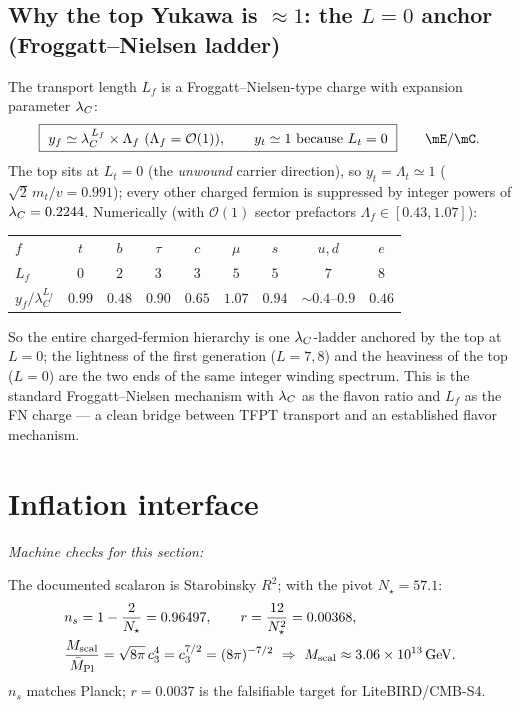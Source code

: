 \subsection{Why the top Yukawa is $\approx1$: the $L=0$ anchor (Froggatt--Nielsen ladder)}
The transport length $L_f$ is a Froggatt--Nielsen-type charge with expansion parameter $\lambda_C$:
\begin{equation}
  \boxed{\ y_f\simeq\lambda_C^{\,L_f}\times\Lambda_f\ (\Lambda_f=\mathcal O(1)),\qquad y_t\simeq1\ \text{because}\ L_t=0\ }\qquad\mE/\mC .
\end{equation}
The top sits at $L_t=0$ (the \emph{unwound} carrier direction), so $y_t=\Lambda_t\simeq1$
($\sqrt2\,m_t/v=0.991$); every other charged fermion is suppressed by integer powers of
$\lambda_C=0.2244$. Numerically (with $\mathcal O(1)$ sector prefactors $\Lambda_f\in[0.43,1.07]$):
\begin{center}\small
\begin{tabular}{@{}lcccccccc@{}}
\toprule
$f$ & $t$ & $b$ & $\tau$ & $c$ & $\mu$ & $s$ & $u,d$ & $e$ \\
$L_f$ & $0$ & $2$ & $3$ & $3$ & $5$ & $5$ & $7$ & $8$ \\
$y_f/\lambda_C^{L_f}$ & $0.99$ & $0.48$ & $0.90$ & $0.65$ & $1.07$ & $0.94$ & $\sim0.4$--$0.9$ & $0.46$ \\
\bottomrule
\end{tabular}
\end{center}
So the entire charged-fermion hierarchy is one $\lambda_C$-ladder anchored by the top at $L=0$; the lightness
of the first generation ($L=7,8$) and the heaviness of the top ($L=0$) are the two ends of the same
integer winding spectrum. This is the standard Froggatt--Nielsen mechanism with $\lambda_C$ as the flavon
ratio and $L_f$ as the FN charge --- a clean bridge between TFPT transport and an established flavor
mechanism.

\section{Inflation interface}
\noindent\emph{Machine checks for this section:}   


The documented scalaron is Starobinsky $R^2$; with the pivot $N_\star=57.1$:
\begin{equation}
\begin{aligned}
  &n_s=1-\frac{2}{N_\star}=0.96497,\qquad r=\frac{12}{N_\star^2}=0.00368,\\
  &\frac{M_{\mathrm{scal}}}{\Mbar}=\sqrt{8\pi}\,\cthree^4=\cthree^{7/2}=(8\pi)^{-7/2}
  \ \Rightarrow\ M_{\mathrm{scal}}\approx3.06\times10^{13}\,\mathrm{GeV}.
\end{aligned}
\end{equation}
$n_s$ matches Planck; $r=0.0037$ is the falsifiable target for LiteBIRD/CMB-S4.

